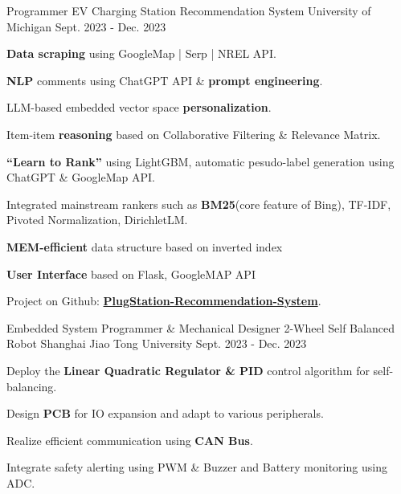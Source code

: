 

\begin{cventries}

  \begin{cventry}
    {Programmer}
    {EV Charging Station Recommendation System}
    {University of Michigan}
    {Sept. 2023 - Dec. 2023}
    {
      \begin{cvitems}
        \item {\textbf{Data scraping} using GoogleMap | Serp | NREL API.}
        \item {\textbf{NLP} comments using ChatGPT API \& \textbf{prompt engineering}.}
        \item {LLM-based embedded vector space \textbf{personalization}.}
        \item {Item-item \textbf{reasoning} based on Collaborative Filtering \& Relevance Matrix.}
        \item {\textbf{“Learn to Rank”} using LightGBM, automatic pesudo-label generation using ChatGPT \& GoogleMap API.}
        \item {Integrated mainstream rankers such as \textbf{BM25}(core feature of Bing), TF-IDF, Pivoted Normalization, DirichletLM.}
        \item {\textbf{MEM-efficient} data structure based on inverted index}
        \item {\textbf{User Interface} based on Flask, GoogleMAP API}
        \item {Project on Github: \href{https://github.com/priest-yang/PlugStation-Recommendation-System}{\textbf{PlugStation-Recommendation-System}}.}
       \end{cvitems}
    }
  \end{cventry}

  \begin{cventry}
    {Embedded System Programmer \& Mechanical Designer}
    {2-Wheel Self Balanced Robot}
    {Shanghai Jiao Tong University}
    {Sept. 2023 - Dec. 2023}
    {
      \begin{cvitems}
        \item {Deploy the \textbf{Linear Quadratic Regulator \& PID} control algorithm for self-balancing.}
        \item {Design \textbf{PCB} for IO expansion and adapt to various peripherals.}
        \item {Realize efficient communication using \textbf{CAN Bus}.}
        \item {Integrate safety alerting using PWM \& Buzzer and Battery monitoring using ADC.}
      \end{cvitems}
    }
  \end{cventry}
  





\end{cventries}
